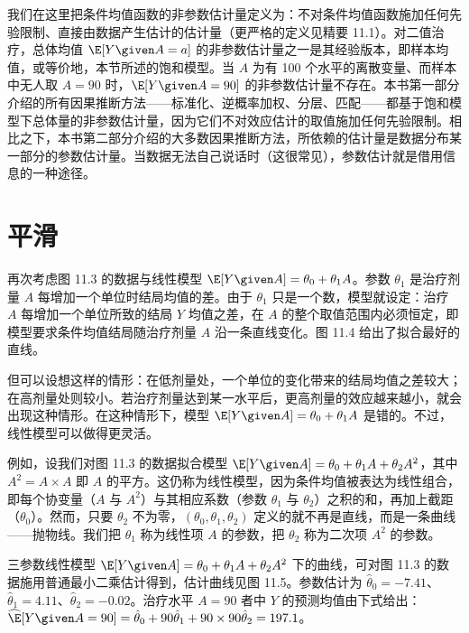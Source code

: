 我们在这里把条件均值函数的非参数估计量定义为：不对条件均值函数施加任何先验限制、直接由数据产生估计的估计量（更严格的定义见精要 11.1）。对二值治疗，总体均值 $\E[Y\given A=a]$ 的非参数估计量之一是其经验版本，即样本均值，或等价地，本节所述的饱和模型。当 $A$ 为有 100 个水平的离散变量、而样本中无人取 $A=90$ 时，$\E[Y\given A=90]$ 的非参数估计量不存在。本书第一部分介绍的所有因果推断方法——标准化、逆概率加权、分层、匹配——都基于饱和模型下总体量的非参数估计量，因为它们不对效应估计的取值施加任何先验限制。相比之下，本书第二部分介绍的大多数因果推断方法，所依赖的估计量是数据分布某一部分的参数估计量。当数据无法自己说话时（这很常见），参数估计就是借用信息的一种途径。


\section{平滑}

再次考虑图 11.3 的数据与线性模型 $\E[Y\given A]=\theta_0+\theta_1 A$。参数 $\theta_1$ 是治疗剂量 $A$ 每增加一个单位时结局均值的差。由于 $\theta_1$ 只是一个数，模型就设定：治疗 $A$ 每增加一个单位所致的结局 $Y$ 均值之差，在 $A$ 的整个取值范围内必须恒定，即模型要求条件均值结局随治疗剂量 $A$ 沿一条直线变化。图 11.4 给出了拟合最好的直线。

但可以设想这样的情形：在低剂量处，一个单位的变化带来的结局均值之差较大；在高剂量处则较小。若治疗剂量达到某一水平后，更高剂量的效应越来越小，就会出现这种情形。在这种情形下，模型 $\E[Y\given A]=\theta_0+\theta_1 A$ 是错的。不过，线性模型可以做得更灵活。


例如，设我们对图 11.3 的数据拟合模型 $\E[Y\given A]=\theta_0+\theta_1 A+\theta_2 A^2$，其中 $A^2=A\times A$ 即 $A$ 的平方。这仍称为线性模型，因为条件均值被表达为线性组合，即每个协变量（$A$ 与 $A^2$）与其相应系数（参数 $\theta_1$ 与 $\theta_2$）之积的和，再加上截距（$\theta_0$）。然而，只要 $\theta_2$ 不为零，$(\theta_0,\theta_1,\theta_2)$ 定义的就不再是直线，而是一条曲线——抛物线。我们把 $\theta_1$ 称为线性项 $A$ 的参数，把 $\theta_2$ 称为二次项 $A^2$ 的参数。

三参数线性模型 $\E[Y\given A]=\theta_0+\theta_1 A+\theta_2 A^2$ 下的曲线，可对图 11.3 的数据施用普通最小二乘估计得到，估计曲线见图 11.5。参数估计为 $\hat\theta_0=-7.41$、$\hat\theta_1=4.11$、$\hat\theta_2=-0.02$。治疗水平 $A=90$ 者中 $Y$ 的预测均值由下式给出：$\widehat{\E}[Y\given A=90]=\hat\theta_0+90\hat\theta_1+90\times90\hat\theta_2=197.1$。


